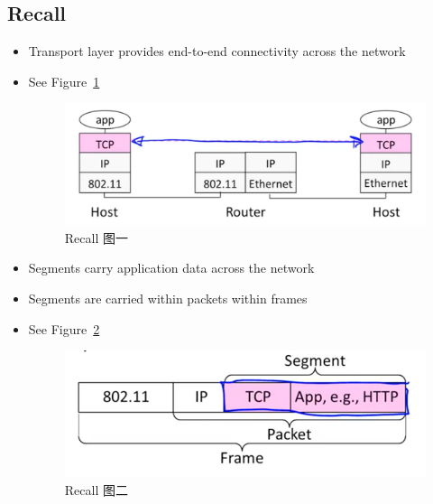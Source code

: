 \documentclass[12pt]{ctexart}   %
\begin{document}
	\subsection{Recall}
	\begin{itemize}
		\item Transport layer provides end-to-end connectivity across the network
		\item See Figure~\ref{fig:6-1-1}
			
		\begin{figure}[h!] %
		\centering
		 \includegraphics[scale=0.7]{images/6-1-1}
		\caption{ Recall 图一 }
		 \label{fig:6-1-1}
		 \end{figure}
		 
		 \item Segments carry application data across the network
		 \item Segments are carried within packets within frames
		 \item See Figure~\ref{fig:6-1-2}
		 
		 \begin{figure}[h!] %
		\centering
		 \includegraphics[scale=0.7]{images/6-1-2}
		\caption{ Recall 图二 }
		 \label{fig:6-1-2}
		 \end{figure}
	\end{itemize}
	
\end{document}
